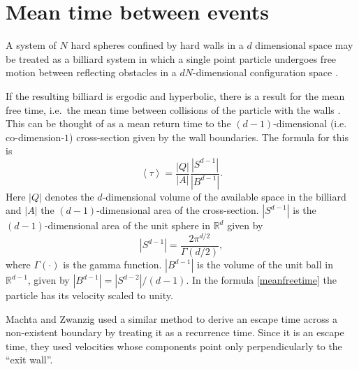 \documentclass[a4paper,10pt]{article}
\newcommand{\mean}[1]{\left \langle #1 \right \rangle}
\newcommand{\RR}{\mathbb{R}}
\begin{document}
\section{Mean time between events}

A system of $N$ hard spheres confined by hard walls in a $d$ dimensional
space may be treated as a billiard system 
in which a single point  particle undergoes free motion between reflecting obstacles 
in a $ d N $-dimensional configuration space \cite{Sinai70, MarkChern} . 

If the resulting billiard is ergodic and hyperbolic, 
there is a result for the mean free time, i.e.\ the mean time between 
collisions of the particle with the walls \cite{MarkChern}. 
This can be thought of as a mean return time to the $(d-1)$-dimensional 
(i.e. co-dimension-$1$) cross-section given by the wall boundaries.
The formula for this is
\begin{equation}\label{meanfreetime}
 \mean{\tau} = \frac{|Q|}{|A|} \frac{|S^{d-1}|}{|B^{d-1}|}.
\end{equation}
Here $|Q|$ denotes the $d$-dimensional volume of the available space in the billiard and 
$|A|$ the $(d-1)$-dimensional area of the cross-section.
 $|S^{d-1}|$ is the $(d-1)$-dimensional area of the unit sphere in $\RR^d$ given by
\begin{equation}
  |S^{d-1}| = \frac{2 \pi^{d/2}}{\Gamma(d/2)},
\end{equation}
where $\Gamma(\cdot)$ is the gamma function. 
$|B^{d-1}|$ is the volume of the unit ball 
in $\RR^{d-1}$, given by $|B^{d-1}| = |S^{d-2}| / (d-1)$.
In the formula \ref{meanfreetime}  the particle has 
its velocity scaled to unity.

Machta and Zwanzig \cite{MachtaZwan} used a similar method to derive an escape 
time across a non-existent boundary by treating it as a recurrence time.
Since it is an escape time, they used velocities whose components point only 
perpendicularly to the ``exit wall''.
\end{document}
